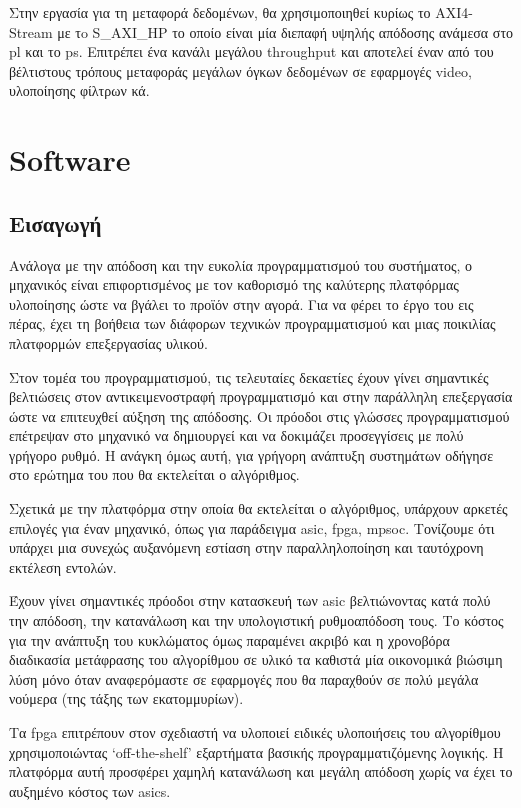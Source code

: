 Στην εργασία για τη μεταφορά δεδομένων, θα χρησιμοποιηθεί κυρίως το AXI4-Stream με τo S\_AXI\_HP το οποίο είναι μία διεπαφή υψηλής απόδοσης ανάμεσα στο \gls{pl} και το \gls{ps}. Επιτρέπει ένα κανάλι μεγάλου throughput και αποτελεί έναν από του βέλτιστους τρόπους μεταφοράς μεγάλων όγκων δεδομένων σε εφαρμογές video, υλοποίησης φίλτρων κά.
\section{Software}
\subsection{Εισαγωγή}

Ανάλογα με την απόδοση και την ευκολία προγραμματισμού του συστήματος, ο μηχανικός είναι επιφορτισμένος με τον καθορισμό της καλύτερης πλατφόρμας υλοποίησης ώστε να βγάλει το προϊόν στην αγορά. Για να φέρει το έργο του εις πέρας, έχει τη βοήθεια των διάφορων τεχνικών προγραμματισμού και μιας ποικιλίας πλατφορμών επεξεργασίας υλικού.

Στον τομέα του προγραμματισμού, τις τελευταίες δεκαετίες έχουν γίνει σημαντικές βελτιώσεις στον αντικειμενοστραφή προγραμματισμό και στην παράλληλη επεξεργασία ώστε να επιτευχθεί αύξηση της απόδοσης. Οι πρόοδοι στις γλώσσες προγραμματισμού επέτρεψαν στο μηχανικό να δημιουργεί και να δοκιμάζει προσεγγίσεις με πολύ γρήγορο ρυθμό. Η ανάγκη όμως αυτή, για γρήγορη ανάπτυξη συστημάτων οδήγησε στο ερώτημα του που θα εκτελείται ο αλγόριθμος.

Σχετικά με την πλατφόρμα στην οποία θα εκτελείται ο αλγόριθμος, υπάρχουν αρκετές επιλογές για έναν μηχανικό, όπως για παράδειγμα \gls{asic}, \gls{fpga}, \gls{mpsoc}. Τονίζουμε ότι υπάρχει μια συνεχώς αυξανόμενη εστίαση στην παραλληλοποίηση και ταυτόχρονη εκτέλεση εντολών.

Έχουν γίνει σημαντικές πρόοδοι στην κατασκευή των \gls{asic} βελτιώνοντας κατά πολύ την απόδοση, την κατανάλωση και την υπολογιστική ρυθμοαπόδοση τους. Το κόστος για την ανάπτυξη του κυκλώματος όμως παραμένει ακριβό και η χρονοβόρα διαδικασία μετάφρασης του αλγορίθμου σε υλικό τα καθιστά μία οικονομικά βιώσιμη λύση μόνο όταν αναφερόμαστε σε εφαρμογές που θα παραχθούν σε πολύ μεγάλα νούμερα (της τάξης των εκατομμυρίων).

Τα \gls{fpga} επιτρέπουν στον σχεδιαστή να υλοποιεί ειδικές υλοποιήσεις του αλγορίθμου χρησιμοποιώντας `off-the-shelf' εξαρτήματα βασικής προγραμματιζόμενης λογικής. Η πλατφόρμα αυτή προσφέρει χαμηλή κατανάλωση και μεγάλη απόδοση χωρίς να έχει το αυξημένο κόστος των \gls{asic}s.

